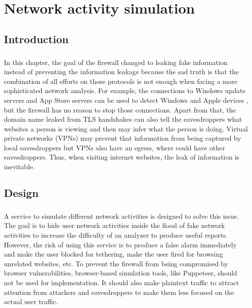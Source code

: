 \documentclass[mscthesis]{usiinfthesis}
\begin{document}
\chapter{Network activity simulation}
\section{Introduction}
\paragraph{}
In this chapter, the goal of the firewall changed to leaking fake information instead of preventing the information leakage because the sad truth is that the combination of all efforts on those protocols is not enough when facing a more sophisticated network analysis. For example, the connections to Windows update servers and App Store servers can be used to detect Windows and Apple devices \citep{osandtether}, but the firewall has no reason to stop those connections. Apart from that, the domain name leaked from TLS handshakes can also tell the eavesdroppers what websites a person is viewing and then may infer what the person is doing. Virtual private networks (VPNs) may prevent that information from being captured by local eavesdroppers but VPNs also have an egress, where could have other eavesdroppers. Thus, when visiting internet websites, the leak of information is inevitable.

\section{Design}
\paragraph{}
A service to simulate different network activities is designed to solve this issue. The goal is to hide user network activities inside the flood of fake network activities to increase the difficulty of an analyzer to produce useful reports. However, the risk of using this service is to produce a false alarm immediately and make the user blocked for tethering, make the user fired for browsing unrelated websites, etc. To prevent the firewall from being compromised by browser vulnerabilities, browser-based simulation tools, like Puppeteer, should not be used for implementation. It should also make plaintext traffic to attract attention from attackers and eavesdroppers to make them less focused on the actual user traffic.
\end{document}
